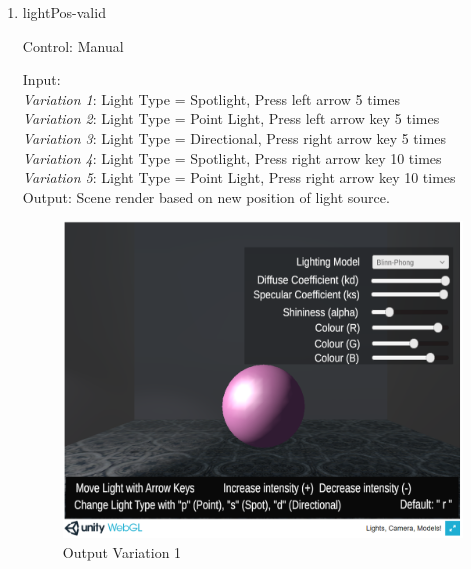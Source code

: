 \documentclass[12pt, titlepage]{article}
\begin{document}
\begin{enumerate}
	\item{lightPos-valid\\}
	
	Control: Manual
	
	Input: \\
	\textit{Variation 1}: Light Type = Spotlight, Press left arrow 5 times\\
	\textit{Variation 2}: Light Type = Point Light, Press left arrow key 5 
	times\\
	\textit{Variation 3}: Light Type = Directional, Press right arrow key 5 
	times\\
	\textit{Variation 4}: Light Type = Spotlight, Press right arrow key 10
	times\\
	\textit{Variation 5}: Light Type = Point Light, Press right arrow key 10
	times\\
	
	Output: Scene render based on new position of light source.

	\begin{figure}[h]
	\centering
	\includegraphics[scale=0.25]{./images/sphere-lit-spotlight-moveValid}
	\caption{Output Variation 1}
	\label{fig:spotlight-move}
	\end{figure}	
	

\end{enumerate}
\end{document}

